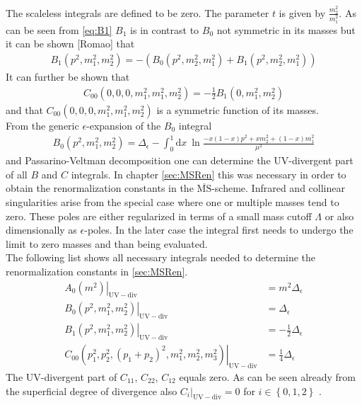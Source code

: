The scaleless integrals are defined to be zero. The parameter $t$ is given by $\frac{m_2^2}{m_1^2}$. As can be seen from \ref{eq:B1} $B_1$ is in contrast to $B_0$ not symmetric in its masses but it can be shown [Romao] that
\begin{align}
B_1(p^2,m_1^2,m_2^2) = -(B_0(p^2,m_2^2,m_1^2) + B_1(p^2,m_2^2,m_1^2))
\end{align}
It can further be shown that
\begin{align}
C_{00}(0,0,0,m_1^2, m_1^2, m_2^2) = -\frac{1}{2}B_1(0, m_1^2, m_2^2)
\end{align} and that $C_{00}(0,0,0,m_1^2, m_1^2, m_2^2)$ is a symmetric function of its masses.\\
From the generic $\epsilon$-expansion of the $B_0$ integral \cite{Denner}
\begin{align}
B_0(p^2,m_1^2,m_2^2) = \Delta_\epsilon - \int_0^1\mathrm{d}x\ \ln \frac{-x(1-x)p^2 + xm_2^2 + (1-x)m_1^2}{\mu^2}
\end{align} 
and Passarino-Veltman decomposition \cite{Passarino:1978jh} one can determine the UV-divergent part of all $B$ and $C$ integrals. In chapter \ref{sec:MSRen} this was necessary in order to obtain the renormalization constants in the $\overline{\mathrm{MS}}$-scheme. Infrared and collinear singularities arise from the special case where one or multiple masses tend to zero. These poles are either regularized in terms of a small mass cutoff $\Lambda$ or also dimensionally as $\epsilon$-poles. In the later case the integral first needs to undergo the limit to zero masses and than being evaluated.\\
The following list shows all necessary integrals needed to determine the renormalization constants in \ref{sec:MSRen}.
\begin{align}
\left.A_0(m^2)\right|_{\mathrm{UV-div}} &= m^2 \Delta_\epsilon\\
\left.B_0(p^2,m_1^2,m_2^2)\right|_{\mathrm{UV-div}} &= \Delta_\epsilon\\
\left.B_1(p^2,m_1^2,m_2^2)\right|_{\mathrm{UV-div}} &= -\frac{1}{2}\Delta_\epsilon\\
\left.C_{00}(p_1^2,p_2^2,(p_1+p_2)^2,m_1^2,m_2^2,m_3^2)\right|_{\mathrm{UV-div}} &= \frac{1}{4}\Delta_\epsilon
\end{align}
The UV-divergent part of $C_{11}$, $C_{22}$, $C_{12}$ equals zero. As can be seen already from the superficial degree of divergence also $C_i|_{\mathrm{UV-div}} = 0$ for $i \in \left\{ 0, 1, 2 \right\}$ .



